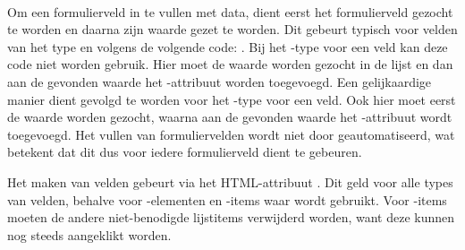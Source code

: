 \begin{table}[H]
\centering
{}
\caption{Gebruik van  voor \st{}~(\sta), \kendo{}~(\kendoa), \jqm{}~(\jqma) en \lungo{}~(\lungoa).}
\label{tabel:evaluatie-gebruik-vullen}
\end{table}

\paragraph{\jqm}
Om een formulierveld in te vullen met data, dient eerst het formulierveld gezocht te worden en daarna zijn waarde gezet te worden.
Dit gebeurt typisch voor velden van het type  en  volgens de volgende code: .
Bij het -type voor een veld kan deze code niet worden gebruik.
Hier moet de waarde worden gezocht in de lijst en dan aan de gevonden waarde het -attribuut worden toegevoegd.
Een gelijkaardige manier dient gevolgd te worden voor het -type voor een veld.
Ook hier moet eerst de waarde worden gezocht, waarna aan de gevonden waarde het -attribuut wordt toegevoegd.
Het vullen van formuliervelden wordt niet door \jqm{} geautomatiseerd, wat betekent dat dit dus voor iedere formulierveld dient te gebeuren.

Het  maken van velden gebeurt via het HTML-attribuut .
Dit geld voor alle types van velden, behalve voor -elementen en -items waar  wordt gebruikt.
Voor -items moeten de andere niet-benodigde lijstitems verwijderd worden, want deze kunnen nog steeds aangeklikt worden.

